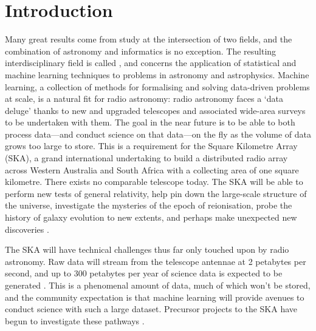 \chapter{Introduction}
\label{cha:intro}



Many great results come from study at the intersection of two fields, and the combination of astronomy and informatics is no exception. The resulting interdisciplinary field is called , and concerns the application of statistical and machine learning techniques to problems in astronomy and astrophysics.
Machine learning, a collection of methods for formalising and solving data-driven problems at scale, is a natural fit for radio astronomy: radio astronomy faces a `data deluge' thanks to new and upgraded telescopes and associated wide-area surveys to be undertaken with them. The goal in the near future is to be able to both process data---and conduct science on that data---on the fly as the volume of data grows too large to store. This is a requirement for the Square Kilometre Array (SKA), a grand international undertaking to build a distributed radio array across Western Australia and South Africa with a collecting area of one square kilometre. There exists no comparable telescope today. The SKA will be able to perform new tests of general relativity, help pin down the large-scale structure of the universe, investigate the mysteries of the epoch of reionisation, probe the history of galaxy evolution to new extents, and perhaps make unexpected new discoveries \citep{diamond_ska_2017}.

The SKA will have technical challenges thus far only touched upon by radio astronomy. Raw data will stream from the telescope antennae at 2 petabytes per second, and up to 300 petabytes per year of science data is expected to be generated \citep{diamond_ska_2017}. This is a phenomenal amount of data, much of which won't be stored, and the community expectation is that machine learning will provide avenues to conduct science with such a large dataset. Precursor projects to the SKA have begun to investigate these pathways \citep[e.g.][]{kapinska_emu_2020,mostert_unveiling_2020}.

